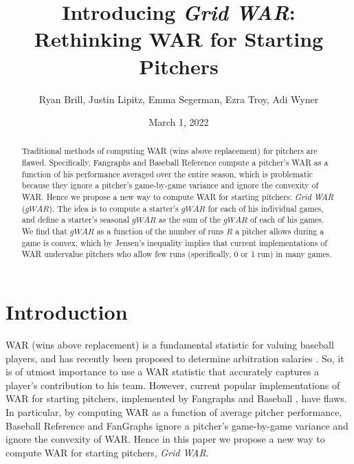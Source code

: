 \documentclass[12pt]{article}
\title{Introducing \textit{Grid WAR}: \\ Rethinking WAR for Starting Pitchers}
\author{Ryan Brill, Justin Lipitz, Emma Segerman, Ezra Troy, Adi Wyner}
\date{March 1, 2022}
\begin{document}
\maketitle

\begin{abstract}
Traditional methods of computing WAR (wins above replacement) for pitchers are flawed. Specifically, Fangraphs and Baseball Reference compute a pitcher's WAR as a function of his performance averaged over the entire season, which is problematic because they ignore a pitcher's game-by-game variance and ignore the convexity of WAR.  Hence we propose a new way to compute WAR for starting pitchers: \textit{Grid WAR} ($gWAR$). The idea is to compute a starter's $gWAR$ for each of his individual games, and define a starter's seasonal $gWAR$ as the sum of the $gWAR$ of each of his games. We find that $gWAR$ as a function of the number of runs $R$ a pitcher allows during a game is convex, which by Jensen's inequality implies that current implementations of WAR undervalue pitchers who allow few runs (specifically, 0 or 1 run) in many games.
\end{abstract}

\section{Introduction}


WAR (wins above replacement) is a fundamental statistic for valuing baseball players, and has recently been proposed to determine arbitration salaries \citep{war_arb}. So, it is of utmost importance to use a WAR statistic that accurately captures a player's contribution to his team. However, current popular implementations of WAR for starting pitchers, implemented by Fangraphs \citep{war_FG} and Baseball \citet{war_BR}, have flaws. In particular, by computing WAR as a function of average pitcher performance, Baseball Reference and FanGraphs ignore a pitcher's game-by-game variance and ignore the convexity of WAR. Hence in this paper we propose a new way to compute WAR for starting pitchers, \textit{Grid WAR}. 
\end{document}
